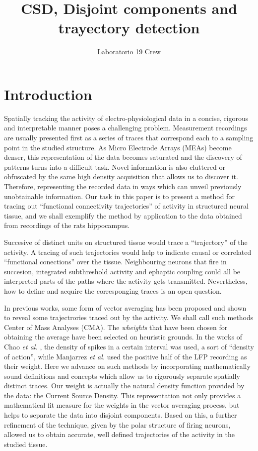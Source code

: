 \documentclass{article}
\author{Laboratorio 19 Crew}
\title{CSD, Disjoint components and trayectory detection}
\begin{document}
\maketitle

\section{Introduction}

Spatially tracking the activity of electro-physiological data in a concise, rigorous and interpretable manner poses a challenging problem. Measurement recordings are usually presented first as a series of traces that correspond each to a sampling point in the studied structure. As Micro Electrode Arrays (MEAs) become denser, this representation of the data becomes saturated and the discovery of patterns turns into a difficult task. Novel information is also cluttered or obfuscated by the same high density acquisition that allows us to discover it. Therefore, representing  the recorded data in ways which can unveil previously unobtainable information. Our task in this paper is to present a method for tracing out ``functional connectivity trajectories'' of activity in structured neural tissue, and we shall exemplify the method by application to the data obtained from recordings of the rats hippocampus. 

Succesive  of distinct units on structured tissue would trace a ``trajectory'' of the activity. A tracing of such trajectories would help to indicate causal or correlated ``functional conections'' over the tissue. Neighbouring neurons that fire in succesion, integrated subthreshold activity and ephaptic coupling could all be interpreted parts of the paths where the activity gets transmitted. Nevertheless, how to define and acquire the corresponging traces is an open question.

In previous works, some form of vector averaging has been proposed and shown to reveal some trajectrories traced out by the activity. We shall call such methods Center of Mass Analyses (CMA).  The \emph{wheights} that have been chosen for obtaining the average have been selected on heuristic grounds. In the works of Chao \emph{et al.} \cite{Chao05, Chao07}, the density of spikes in a certain interval was used, a sort of ``density of action'', while Manjarrez \emph{et al.} \cite{Manjarrez07, Manjarrez09} used the positive half of the LFP recording as their weight. 
Here we advance on such methods by incorporating mathematically sound definitions and concepts which allow us to rigorously separate spatially distinct traces. Our weight is actually the natural density function provided by the data: the Current Source Density. This representation not only provides a mathematical fit measure for the weights in the vector averaging process, but helps to separate the data into disjoint components. Based on this, a further refinement of the technique, given by the polar structure of firing neurons, allowed us to obtain accurate, well defined trajectories of the activity in the studied tissue. 
\end{document}
